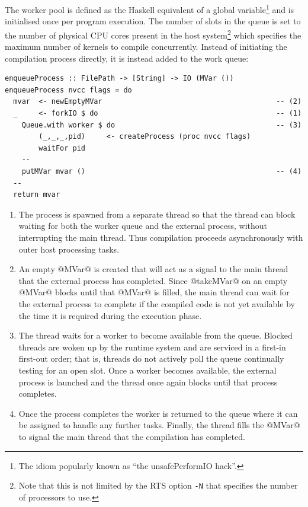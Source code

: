 The worker pool is defined as the Haskell equivalent of a global
variable\footnote{The idiom popularly known as ``the unsafePerformIO hack''.}
and is initialised once per program execution. The number of slots in the queue
is set to the number of physical CPU cores present in the host
system\footnote{Note that this is not limited by the RTS option \texttt{-N} that
specifies the number of processors to use.} which specifies the maximum number
of kernels to compile concurrently. Instead of initiating the compilation
process directly, it is instead added to the work queue:
%
\begin{lstlisting}[style=haskell,firstnumber=last]
enqueueProcess :: FilePath -> [String] -> IO (MVar ())
enqueueProcess nvcc flags = do
  mvar  <- newEmptyMVar                                         -- (2)
  _     <- forkIO $ do                                          -- (1)
    Queue.with worker $ do                                      -- (3)
        (_,_,_,pid)     <- createProcess (proc nvcc flags)
        waitFor pid
    --
    putMVar mvar ()                                             -- (4)
  --
  return mvar
\end{lstlisting}

\begin{enumerate}
\item The process is spawned from a separate thread so that the thread can block
    waiting for both the worker queue and the external process, without
    interrupting the main thread. Thus compilation proceeds asynchronously with
    outer host processing tasks.

\item An empty @MVar@ is created that will act as a signal to the main
    thread that the external process has completed. Since @takeMVar@ on an
    empty @MVar@ blocks until that @MVar@ is filled, the main thread
    can wait for the external process to complete if the compiled code is not
    yet available by the time it is required during the execution phase.

\item The thread waits for a worker to become available from the queue. Blocked
    threads are woken up by the runtime system and are serviced in a first-in
    first-out order; that is, threads do not actively poll the queue continually
    testing for an open slot. Once a worker becomes available, the external
    process is launched and the thread once again blocks until that process
    completes.

\item Once the process completes the worker is returned to the queue where it
    can be assigned to handle any further tasks. Finally, the thread fills the
    @MVar@ to signal the main thread that the compilation has completed.
\end{enumerate}

